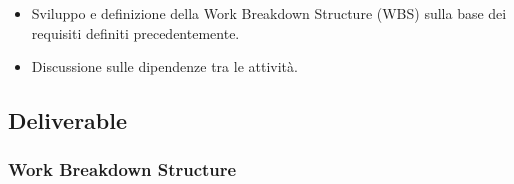 \begin{itemize}
    \item Sviluppo e definizione della Work Breakdown Structure (WBS) sulla base dei requisiti definiti precedentemente.
    \item Discussione sulle dipendenze tra le attività.
\end{itemize}

\subsection{Deliverable}

\subsubsection{Work Breakdown Structure}

